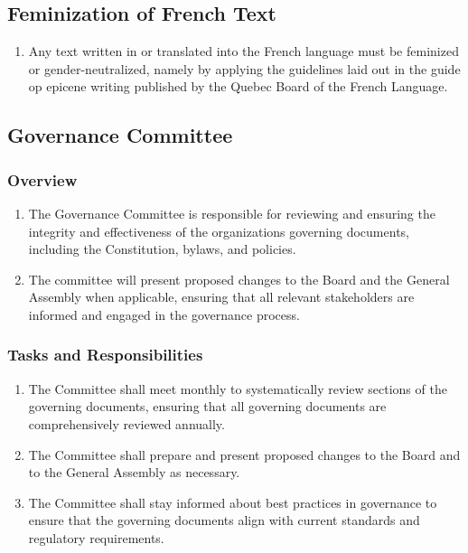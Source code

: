 \subsection{Feminization of French Text}
\label{feminization-of-french-text}

\begin{enumerate}
 \item
  Any text written in or translated into the French language must be feminized or gender-neutralized, namely by applying the guidelines laid out in the guide op epicene writing published by the Quebec Board of the French Language.
\end{enumerate}

\subsection{Governance Committee}
\label{governance-committee}

\subsubsection{Overview}
\label{overview-3}

\begin{enumerate}
 \item
  The Governance Committee is responsible for reviewing and ensuring the integrity and effectiveness of the organization\textquotesingle s governing documents, including the Constitution, bylaws, and policies.
 \item
  The committee will present proposed changes to the Board and the General Assembly when applicable, ensuring that all relevant stakeholders are informed and engaged in the governance process.
\end{enumerate}

\subsubsection{Tasks and Responsibilities}
\label{tasks-and-responsibilities-1}

\begin{enumerate}
 \item
  The Committee shall meet monthly to systematically review sections of the governing documents, ensuring that all governing documents are comprehensively reviewed annually.
 \item
  The Committee shall prepare and present proposed changes to the Board and to the General Assembly as necessary.
 \item
  The Committee shall stay informed about best practices in governance to ensure that the governing documents align with current standards and regulatory requirements.
\end{enumerate}

